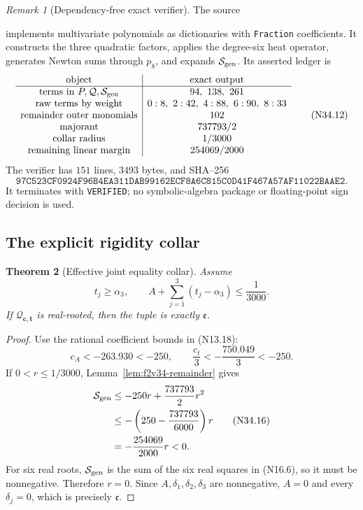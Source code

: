 \documentclass[11pt]{article}
\newtheorem{theorem}{Theorem}[section]
\theoremstyle{definition}
\theoremstyle{remark}
\newtheorem{remark}[theorem]{Remark}
\begin{document}
\begin{remark}[Dependency-free exact verifier]
\label{rec:f2v34-verifier}
The source
\begin{center}
\end{center}
implements multivariate polynomials as dictionaries with
\texttt{Fraction} coefficients.  It constructs the three quadratic
factors, applies the degree-six heat operator, generates Newton sums
through \(p_8\), and expands \(\mathcal S_{\rm gen}\).  Its asserted
ledger is
\[
\begin{array}{c|c}
\text{object}&\text{exact output}\\ \hline
\text{terms in }P,\mathcal Q,\mathcal S_{\rm gen}&94,\ 138,\ 261\\
\text{raw terms by weight}&
0:8,\ 2:42,\ 4:88,\ 6:90,\ 8:33\\
\text{remainder outer monomials}&102\\
\text{majorant}&737793/2\\
\text{collar radius}&1/3000\\
\text{remaining linear margin}&254069/2000
\end{array}
\tag{N34.12}
\]
The verifier has \(151\) lines, \(3493\) bytes, and SHA--256
\[
 \texttt{97C523CF0924F96B4EA311DAB99162ECF8A6C815C0D41F467A57AF11022BAAE2}.
 \tag{N34.13}
\]
It terminates with \texttt{VERIFIED}; no symbolic-algebra package or
floating-point sign decision is used.
\end{remark}

\subsection{The explicit rigidity collar}

\begin{theorem}[Effective joint equality collar]
\label{thm:f2v34-effective-collar}
Assume
\[
 t_j\geq\alpha_3,\qquad
 A+\sum_{j=1}^3(t_j-\alpha_3)\leq\frac1{3000}.
 \tag{N34.14}
\]
If \(\mathcal Q_{\bm c,\bm t}\) is real-rooted, then the tuple is exactly
\(\mathfrak e\).
\end{theorem}

\begin{proof}
Use the rational coefficient bounds in \textup{(N13.18)}:
\[
 c_A<-263.930<-250,\qquad
 \frac{c_t}{3}<-\frac{750.049}{3}<-250.
 \tag{N34.15}
\]
If \(0<r\leq1/3000\), Lemma~\ref{lem:f2v34-remainder} gives
\[
\begin{aligned}
 \mathcal S_{\rm gen}
 &\leq-250r+\frac{737793}{2}r^2\\
 &\leq-
 \left(250-\frac{737793}{6000}\right)r\\
 &=-\frac{254069}{2000}r<0.
\end{aligned}
\tag{N34.16}
\]
For six real roots, \(\mathcal S_{\rm gen}\) is the sum of the six
real squares in \textup{(N16.6)}, so it must be nonnegative.  Therefore
\(r=0\).  Since \(A,\delta_1,\delta_2,\delta_3\) are nonnegative,
\(A=0\) and every \(\delta_j=0\), which is precisely
\(\mathfrak e\).
\end{proof}
\end{document}
